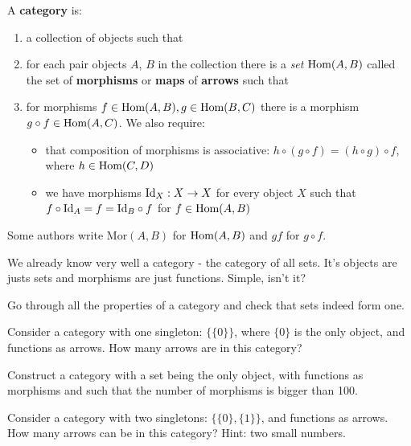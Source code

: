 \begin{definition}
  A \textbf{category} is:
  \begin{enumerate}
    \item a collection of objects such that
    \item for each pair objects $A$, $B$ in the collection there is a \emph{set} $\text{Hom}(A,B)$ called the set of \textbf{morphisms} or \textbf{maps} of \textbf{arrows} such that
    \item for morphisms $f\in \text{Hom}(A,B), g\in \text{Hom}(B,C)$ there is a morphism $g\circ f\in \text{Hom}(A,C)$. We also require:
      \begin{itemize}
        \item that composition of morphisms is associative: $h\circ(g\circ f)=(h\circ g)\circ f$, where $h\in \text{Hom}(C, D)$
        \item we have morphisms $\text{Id}_X: X\to X$ for every object $X$ such that $f\circ\text{Id}_A = f=\text{Id}_B\circ f$ for $f\in \text{Hom}(A,B)$
      \end{itemize}
  \end{enumerate}
  Some authors write $\text{Mor}(A,B)$ for $\text{Hom}(A,B)$ and $gf$ for $g\circ f$.
\end{definition}

\begin{example}
  We already know very well a category - the category of all sets. It's objects are justs sets and morphisms are just functions. Simple, isn't it?
\end{example}

\begin{exercise}
  Go through all the properties of a category and check that sets indeed form one.
\end{exercise}

\begin{exercise}
  Consider a category with one singleton: $\{\{0\}\}$, where $\{0\}$ is the only object, and functions as arrows. How many arrows are in this category?
\end{exercise}

\begin{exercise}
  Construct a category with a set being the only object, with functions as morphisms and such that the number of morphisms is bigger than 100.  
\end{exercise}

\begin{exercise}
  Consider a category with two singletons: $\{\{0\}, \{1\}\}$, and functions as arrows. How many arrows can be in this category? Hint: two small numbers.
\end{exercise}
